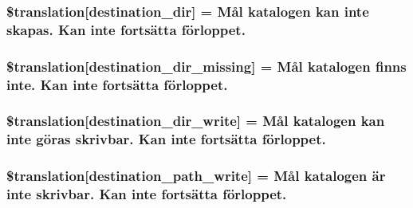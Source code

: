 \subsubsection[{\$translation}]{\setlength{\rightskip}{0pt plus 5cm}\$translation\mbox{[}\textquotesingle{}destination\+\_\+dir\textquotesingle{}\mbox{]} = \textquotesingle{}Mål katalogen kan inte skapas. Kan inte fortsätta förloppet.\textquotesingle{}}\label{class_8upload_8sv___s_e_8php_aff2427c72a2598aefa6d58df1dd18b08}
\hypertarget{class_8upload_8sv___s_e_8php_a9ef28d3cf09942c6c0a1e77fa09185e8}{}
\subsubsection[{\$translation}]{\setlength{\rightskip}{0pt plus 5cm}\$translation\mbox{[}\textquotesingle{}destination\+\_\+dir\+\_\+missing\textquotesingle{}\mbox{]} = \textquotesingle{}Mål katalogen finns inte. Kan inte fortsätta förloppet.\textquotesingle{}}\label{class_8upload_8sv___s_e_8php_a9ef28d3cf09942c6c0a1e77fa09185e8}
\hypertarget{class_8upload_8sv___s_e_8php_a97608ea194a616db49141a0e6dee900c}{}
\subsubsection[{\$translation}]{\setlength{\rightskip}{0pt plus 5cm}\$translation\mbox{[}\textquotesingle{}destination\+\_\+dir\+\_\+write\textquotesingle{}\mbox{]} = \textquotesingle{}Mål katalogen kan inte göras skrivbar. Kan inte fortsätta förloppet.\textquotesingle{}}\label{class_8upload_8sv___s_e_8php_a97608ea194a616db49141a0e6dee900c}
\hypertarget{class_8upload_8sv___s_e_8php_a40e4e1962226b89fd76da5819a9602b0}{}
\subsubsection[{\$translation}]{\setlength{\rightskip}{0pt plus 5cm}\$translation\mbox{[}\textquotesingle{}destination\+\_\+path\+\_\+write\textquotesingle{}\mbox{]} = \textquotesingle{}Mål katalogen är inte skrivbar. Kan inte fortsätta förloppet.\textquotesingle{}}\label{class_8upload_8sv___s_e_8php_a40e4e1962226b89fd76da5819a9602b0}
\hypertarget{class_8upload_8sv___s_e_8php_a2baece8da11e20d45175db91851ec3e3}{}
